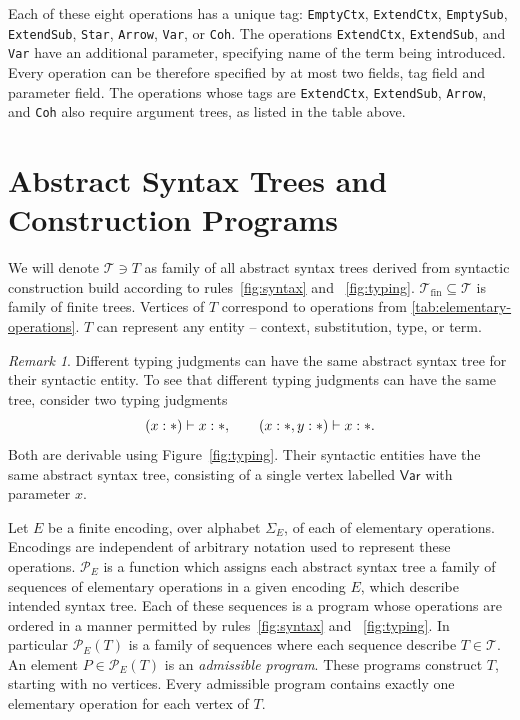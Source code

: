 \documentclass{article}%
\theoremstyle{remark}
\newtheorem{remark}[theorem]{Remark}
\theoremstyle{definition}
\theoremstyle{definition}
\newtheorem{definition}[theorem]{Definition}
\theoremstyle{plain}
\begin{document}
Each of these eight operations has a unique tag: \texttt{EmptyCtx},
\texttt{ExtendCtx}, \texttt{EmptySub}, \texttt{ExtendSub}, \texttt{Star},
\texttt{Arrow}, \texttt{Var}, or \texttt{Coh}. The operations
\texttt{ExtendCtx}, \texttt{ExtendSub}, and \texttt{Var} have an additional
parameter, specifying name of the term being introduced. Every operation can be
therefore specified by at most two fields, tag field and parameter field. The
operations whose tags are \texttt{ExtendCtx}, \texttt{ExtendSub},
\texttt{Arrow}, and \texttt{Coh} also require argument trees, as listed in the
table above.

\section{Abstract Syntax Trees and Construction Programs}
We will denote \(\mathcal{T} \ni T\) as family of all \catt abstract syntax
trees derived from syntactic construction build according to
rules~\ref{fig:syntax} and ~\ref{fig:typing}. \(\mathcal{T}_\text{fin} \subseteq
\mathcal{T}\) is family of finite trees. Vertices of \(T\) correspond to
operations from \ref{tab:elementary-operations}. \(T\) can
represent any \catt entity -- context, substitution, type, or term.

\begin{remark}
Different typing judgments can have the same abstract syntax tree for their
syntactic entity. To see that different typing judgments can have the same tree,
consider two typing judgments
\[
  (x:\ast)\vdash x:\ast,
  \qquad
  (x:\ast,y:\ast)\vdash x:\ast.
\]
Both are derivable using Figure~\ref{fig:typing}. Their syntactic
entities have the same abstract syntax tree, consisting of a single vertex
labelled \(\mathsf{Var}\) with parameter \(x\).
\end{remark}


Let \(E\) be a finite encoding, over alphabet \(\Sigma_E\), of each of
elementary \catt operations. Encodings are independent of arbitrary notation
used to represent these operations. \(\mathcal{P}_E\) is a function which
assigns each \catt abstract syntax tree a family of sequences of \catt
elementary operations in a given encoding \(E\), which describe intended syntax
tree. Each of these sequences is a program whose operations are ordered in a
manner permitted by rules~\ref{fig:syntax} and ~\ref{fig:typing}. In particular
\(\mathcal{P}_E(T)\) is a family of sequences where each sequence describe
\(T\in\mathcal{T}\). An element \(P \in \mathcal{P}_E(T)\) is an
\emph{admissible program}. These programs construct \(T\), starting with no
vertices. Every admissible program contains exactly one elementary operation for
each vertex of \(T\).
\end{document}

